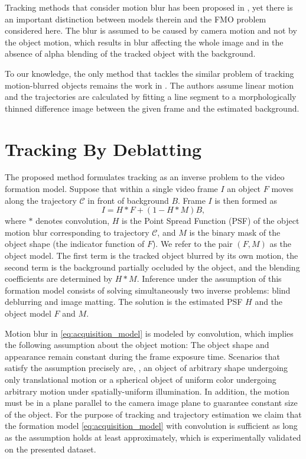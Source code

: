 \documentclass[10pt,twocolumn,letterpaper]{article}
\newcommand{\C}{\mathcal{C}}
\begin{document}
Tracking methods that consider motion blur has been proposed in \cite{Wu2011,Seibold2017,Ma2016}, yet there is an important distinction between models therein and the FMO problem considered here. The blur is assumed to be caused by camera motion and not by the object motion, which results in blur affecting the whole image and in the absence of alpha blending of the tracked object with the background.

To our knowledge, the only method that tackles the similar problem of tracking motion-blurred objects remains the work in \cite{fmo}. The authors assume linear motion and the trajectories are calculated by fitting a line segment to a morphologically thinned difference image between the given frame and the estimated background. 

 
\section{Tracking By Deblatting}
\label{sec:TbD_overview}


The proposed method formulates tracking as an inverse problem to the video formation model. Suppose that within a single video frame $I$ an object $F$ moves along the trajectory $\C$ in front of background $B$. Frame $I$ is then formed as
\begin{equation}
	\label{eq:acquisition_model}
	I = H*F + (1-H*M)B,
\end{equation}
where $*$ denotes convolution, $H$ is the Point Spread Function (PSF) of the object motion blur corresponding to trajectory $\C$, and $M$ is the binary mask of the object shape (\ie the indicator function of $F$). We refer to the pair $(F, M)$  as the object model. 
The first term is the tracked object blurred by its own motion, the second term is the background partially occluded by the object, and the blending coefficients are determined by $H*M$.
Inference under the assumption of this formation model consists of solving simultaneously two inverse problems:
blind deblurring and image matting. The solution is the estimated PSF $H$ and the object model $F$ and $M$.

Motion blur in \eqref{eq:acquisition_model} is modeled by convolution, which implies the following assumption about the object motion: The object shape and appearance remain constant during the frame exposure time. Scenarios that satisfy the assumption precisely are, \eg, an object of arbitrary shape undergoing only translational motion or a spherical object of uniform color undergoing arbitrary motion under spatially-uniform illumination. In addition, the motion must be in a plane parallel to the camera image plane to guarantee constant size of the object. For the purpose of tracking and trajectory estimation we claim that the formation model \eqref{eq:acquisition_model} with convolution is sufficient as long as the assumption holds at least approximately, which is experimentally validated on the presented dataset. 
\end{document}
